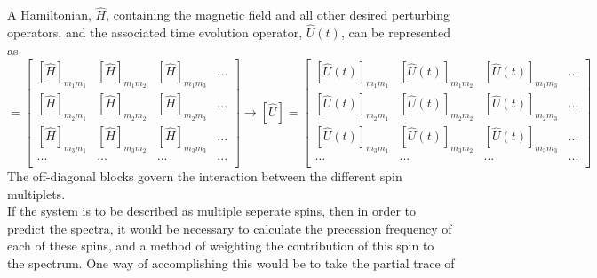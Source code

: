 \documentclass[12pt]{article}
\begin{document}
\noindent A Hamiltonian, $\hat{H}$, containing the magnetic field and all other desired perturbing operators,
and the associated time evolution operator, $\hat{U}(t)$, can be represented as
\begin{equation}
[\hat{H}] =
\begin{bmatrix}
[\hat{H}]_{m_{1}m_{1}} & [\hat{H}]_{m_{1}m_{2}}       & [\hat{H}]_{m_{1}m_{3}}  & ... \\
[\hat{H}]_{m_{2}m_{1}} & [\hat{H}]_{m_{2}m_{2}}       & [\hat{H}]_{m_{2}m_{3}}  & ... \\
[\hat{H}]_{m_{3}m_{1}} & [\hat{H}]_{m_{3}m_{2}}       & [\hat{H}]_{m_{3}m_{3}}  & ... \\
...      & ...     & ...     & ... \\
\end{bmatrix}
\rightarrow
[\hat{U}] =
\begin{bmatrix}
[\hat{U}(t)]_{m_{1}m_{1}} & [\hat{U}(t)]_{m_{1}m_{2}}       & [\hat{U}(t)]_{m_{1}m_{3}}  & ... \\
[\hat{U}(t)]_{m_{2}m_{1}} & [\hat{U}(t)]_{m_{2}m_{2}}       & [\hat{U}(t)]_{m_{2}m_{3}}  & ... \\
[\hat{U}(t)]_{m_{3}m_{1}} & [\hat{U}(t)]_{m_{3}m_{2}}       & [\hat{U}(t)]_{m_{3}m_{3}}  & ... \\
...      & ...     & ...     & ... \\
\end{bmatrix}
\end{equation}
\noindent The off-diagonal blocks govern the interaction between the different spin multiplets.\\

\noindent If the system is to be described as multiple seperate spins, then in order to
predict the spectra, it would be necessary to calculate the precession frequency of each of
these spins, and a method of weighting the contribution of this spin to the spectrum. One way
of accomplishing this would be to take the partial trace of
\end{document}
